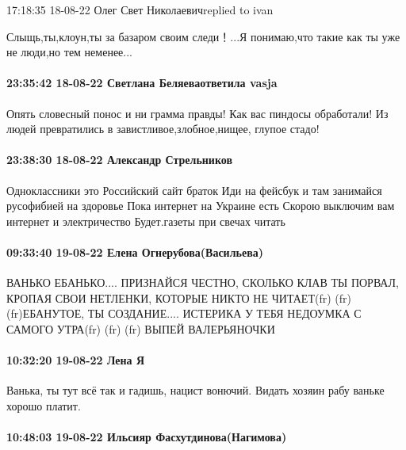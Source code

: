  
 
 
 
 

17:18:35 18-08-22
Олег Свет Николаевичreplied to ivan

Слыщь,ты,клоун,ты за базаром своим следи！...Я понимаю,что такие как ты уже не люди,но тем неменее...

\paragraph{23:35:42 18-08-22 Светлана Беляеваответила vasja}

Опять словесный понос и ни грамма правды! Как вас пиндосы обработали! Из людей
превратились в завистливое,злобное,нищее, глупое стадо!

\paragraph{23:38:30 18-08-22 Александр Стрельников}

Одноклассники это Российский сайт браток Иди на фейсбук и там занимайся
русофибией на здоровье Пока интернет на Украине есть Скорою выключим вам
интернет и электричество Будет.газеты при свечах читать

\paragraph{09:33:40 19-08-22 Елена Огнерубова(Васильева)}

ВАНЬКО ЕБАНЬКО.... ПРИЗНАЙСЯ ЧЕСТНО, СКОЛЬКО КЛАВ ТЫ ПОРВАЛ, КРОПАЯ СВОИ
НЕТЛЕНКИ, КОТОРЫЕ НИКТО НЕ ЧИТАЕТ(fr) (fr) (fr)ЕБАНУТОЕ, ТЫ СОЗДАНИЕ....
ИСТЕРИКА У ТЕБЯ НЕДОУМКА С САМОГО УТРА(fr) (fr) (fr) ВЫПЕЙ ВАЛЕРЬЯНОЧКИ

\paragraph{10:32:20 19-08-22 Лена Я}

Ванька, ты тут всё так и гадишь, нацист вонючий. Видать хозяин рабу ваньке
хорошо платит.

\paragraph{10:48:03 19-08-22 Ильсияр Фасхутдинова(Нагимова)}

